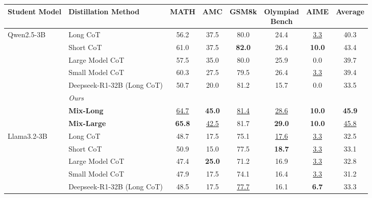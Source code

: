 

\begin{table*}[ht]
    \small
    \centering
    \label{tab:combined-performance}
    \begin{tabular}{l l c c c c c c}
        \toprule
        Student Model & Distillation Method & MATH & AMC & GSM8k & \makecell{Olympiad \\ Bench} & AIME & Average \\
        \midrule
        \multirow{7}{*}{Qwen2.5-3B} 
            & Long CoT                  & 56.2  & 37.5  & 80.0  & 24.4  & \underline{3.3}  & 40.3  \\
            & Short CoT             & 61.0  & 37.5  & \textbf{82.0}  & 26.4  & \textbf{10.0}       & 43.4  \\
            & Large Model CoT  & 57.5  & 35.0  & 80.0  & 25.9  & 0.0              & 39.7  \\
            & Small Model CoT      & 60.3  & 27.5  & 79.5  & 26.4  & \underline{3.3}  & 39.4  \\
            & Deepseek-R1-32B (Long CoT)           & 50.7  & 20.0  & 81.2  & 15.7  & 0.0              & 33.5  \\
        \cmidrule(lr){2-8}
            & \multicolumn{1}{l}{\textit{Ours}} & & & & & & \\
            & \textbf{Mix-Long}                           & \underline{64.7}  & \textbf{45.0}  & \underline{81.4}  & \underline{28.6}  & \textbf{10.0}  & \textbf{45.9}  \\
            & \textbf{Mix-Large}                         & \textbf{65.8}  & \underline{42.5}  & 81.7  & \textbf{29.0}  & \textbf{10.0}  & \underline{45.8}  \\
        \midrule
        \multirow{7}{*}{Llama3.2-3B} 
            & Long CoT                  & 48.7  & 17.5  & 75.1  & \underline{17.6}  & \underline{3.3}  & 32.5  \\
            & Short CoT             & 50.9  & 15.0  & 77.5  & \textbf{18.7}      & \underline{3.3}  & 33.1  \\
            & Large Model CoT  & 47.4  & \textbf{25.0}  & 71.2  & 16.9  & \underline{3.3}  & 32.8  \\
            & Small Model CoT      & 47.9  & 17.5  & 74.1  & 16.4  & \underline{3.3}  & 31.2  \\
            & Deepseek-R1-32B (Long CoT)           & 48.5  & 17.5  & \underline{77.7}  & 16.1  & \textbf{6.7}   & 33.3  \\

\end{tabular}
\end{table*}
